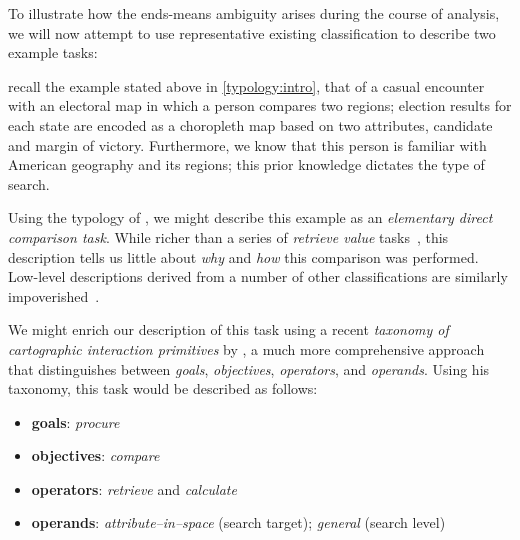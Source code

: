 To illustrate how the ends-means ambiguity arises during the course of analysis, we will now attempt to use representative existing classification to describe two example tasks:

 recall the example stated above in \autoref{typology:intro}, that of a casual encounter with an electoral map in which a person compares two regions; election results for each state are encoded as a choropleth map based on two attributes, candidate and margin of victory.
Furthermore, we know that this person is familiar with American geography and its regions; this prior knowledge dictates the type of search.

Using the typology of \citet{Andrienko2006}, we might describe this example as an {\it elementary direct comparison task}.
While richer than a series of {\it retrieve value} tasks~\cite{Amar2005}, this description tells us little about {\it why} and {\it how} this comparison was performed.
Low-level descriptions derived from a number of other classifications  are similarly impoverished~\cite{Casner1991,Gotz2008,Roth1990,Valiati2006,Wehrend1990,Yi2007,Zhou1998}.

We might enrich our description of this task using a recent {\it taxonomy of cartographic interaction primitives} by \citet{Roth2012,Roth2013}, a much more comprehensive approach that distinguishes between {\it goals}, {\it objectives}, {\it operators}, and {\it operands}.
Using his taxonomy, this task would be described as follows:

\begin{itemize}
    \item {\bf goals}: {\it procure}
    \item {\bf objectives}: {\it compare}
    \item {\bf operators}: {\it retrieve} and {\it calculate}
    \item {\bf operands}: {\it attribute--in--space} (search target); {\it general} (search level)
\end{itemize}


